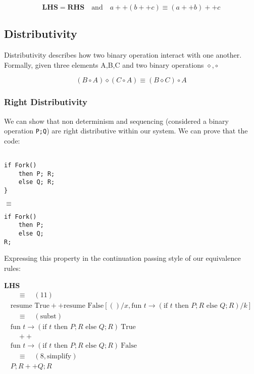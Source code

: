 \documentclass[logo,bsc,singlespacing,parskip]{infthesis}
\begin{document}
\[
\textbf{LHS} = \textbf{RHS} \quad \text{and} \quad a ++ (b ++ c) \equiv (a ++ b) ++ c
\]


\subsection*{Distributivity}
Distributivity describes how two binary operation interact with one another. Formally, given three elements A,B,C and two binary operations $\diamond, \circ $

\[
(B \circ A) \diamond (C \circ A)  \equiv (B \diamond C) \circ A
\]

\subsubsection*{Right Distributivity}
We can show that non determinism and sequencing (considered a binary operation \texttt{P;Q}) are right distributive within our system. 
We can prove that the code:

\begin{lstlisting}

if Fork()
    then P; R;
    else Q; R;
}
\end{lstlisting}
$\equiv$
\begin{lstlisting}
if Fork() 
    then P;
    else Q;
R;
\end{lstlisting}



Expressing this property in the continuation passing style of our equivalence rules:


\textbf{LHS}
\[
\begin{array}{l}

\quad\equiv\quad (11) \\[5pt]
\text{resume True} ++ \text{resume False} [()/x, \text{fun } t \rightarrow (\text{if } t \text{ then } P;R \text{ else } Q;R)/k] \\[5pt]
\quad\equiv\quad (\text{subst}) \\[5pt]
\text{fun } t \rightarrow (\text{if } t \text{ then } P;R \text{ else } Q;R)\ \text{True} \\[2pt]
\quad ++ \\
\text{fun } t \rightarrow (\text{if } t \text{ then } P;R \text{ else } Q;R)\ \text{False} \\[5pt]
\quad\equiv\quad (8, \text{simplify}) \\[5pt]
P;R  ++ Q;R \\[1em]
\end{array}
\]
\end{document}
